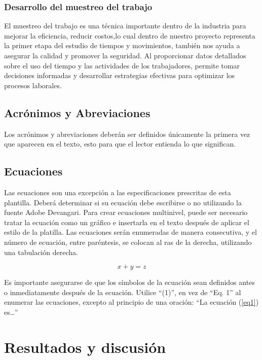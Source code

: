 \subsubsection{Desarrollo del muestreo del trabajo}
El muestreo del trabajo es una técnica importante dentro de la industria para mejorar la eficiencia, reducir costos,lo cual dentro de nuestro proyecto representa la primer etapa del estudio de tiempos y movimientos, también nos ayuda a asegurar la calidad y promover la seguridad. Al proporcionar datos detallados sobre el uso del tiempo y las actividades de los trabajadores, permite tomar decisiones informadas y desarrollar estrategias efectivas para optimizar los procesos laborales.
% 
% 

\subsection{Acrónimos y Abreviaciones}
    
Los acrónimos y abreviaciones deberán ser definidos únicamente la primera vez que aparecen en el texto, esto para que el lector entienda lo que significan.
    
\subsection{Ecuaciones}
    
Las ecuaciones son una excepción a las especificaciones prescritas de esta plantilla. 
Deberá determinar si su ecuación debe escribirse o no utilizando la fuente Adobe Devangari. 
Para crear ecuaciones multinivel, puede ser necesario tratar la ecuación como un gráfico e insertarla en el texto después de aplicar el estilo de la platilla.
Las ecuaciones serán enumeradas de manera consecutiva, y el número de ecuación, entre paréntesis, se colocan al ras de la derecha, utilizando una tabulación derecha. 
    
    \begin{equation}
        \label{eq1}
        x + y = z 
    \end{equation}
    
    Es importante asegurarse de que los símbolos de la ecuación sean definidos antes o inmediatamente después de la ecuación. Utilice “(1)”, en vez de “Eq. 1” al enumerar las ecuaciones, excepto al principio de una oración: “La ecuación (\ref{eq1}) es…”
    
    \section{Resultados y discusión}
